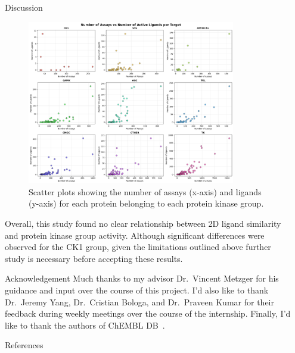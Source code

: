 \documentclass[final]{beamer}
\newlength{\sepwidth}
\newlength{\colwidth}
\newcommand{\separatorcolumn}{\begin{column}{\sepwidth}\end{column}}
\begin{document}
\begin{frame}[t]
\begin{columns}[t]
\begin{column}{\colwidth}
\begin{block}{Discussion}
    \begin{figure}
        \centering
        \includegraphics[width=0.85\textwidth]{../figures/assay_vs_ligand.png}
        \caption{Scatter plots showing the number of assays (x-axis) and ligands (y-axis) for each protein belonging to each protein kinase group.}
        \label{assay_vs_ligand_plot}
    \end{figure}

      \small
      Overall, this study found no clear relationship between 2D ligand similarity and protein kinase group activity. Although significant differences were observed for the CK1 group, given the limitations outlined above further study is necessary before accepting these results. 
  \end{block}

  \begin{block}{Acknowledgement}
  \small{
    Much thanks to my advisor Dr.~Vincent Metzger for his guidance and input over the course of this project. I'd also like to thank Dr.~Jeremy Yang, Dr.~Cristian Bologa, and Dr.~Praveen Kumar for their feedback during weekly meetings over the course of the internship. Finally, I'd like to thank the   authors of ChEMBL DB~\cite{chembl_db_2023}.}
  \end{block}

  \begin{block}{References}
    \tiny{}
  \end{block}

\end{column}

\separatorcolumn
\end{columns}
\end{frame}
\end{document}
